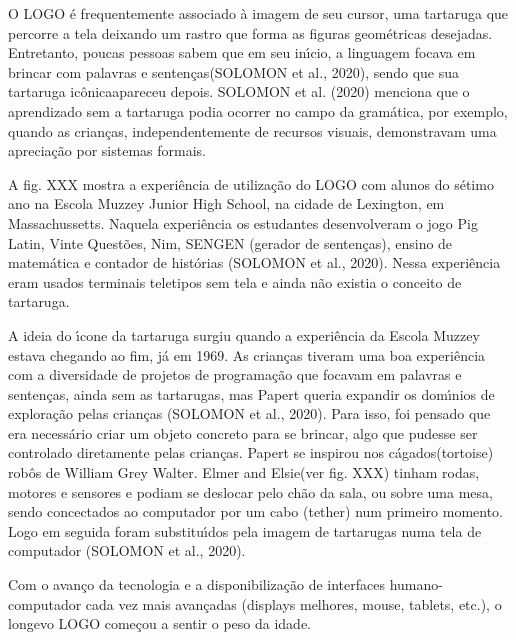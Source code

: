 \documentclass[
12pt,		%
openright,	%
twoside,  %
a4paper,			%
chapter=TITLE,		%
english,			%
french,				%
spanish,			%
brazil				%
]{USPSC-classe/USPSC}
\begin{document}
O LOGO \'e frequentemente associado \`a imagem de seu cursor, uma tartaruga que percorre a tela deixando um rastro que forma as figuras geom\'etricas desejadas. Entretanto, poucas pessoas sabem que em seu in\'{\i}cio, a linguagem \textquotedbl focava em brincar com palavras e senten\c{c}as\textquotedbl  (SOLOMON et al., 2020), sendo que sua tartaruga \textquotedbl ic\^onica\textquotedbl  apareceu depois.  SOLOMON et al. (2020) menciona que o aprendizado sem a tartaruga podia ocorrer no campo da gram\'atica, por exemplo, quando as crian\c{c}as, independentemente de recursos visuais, demonstravam uma aprecia\c{c}\~ao por sistemas formais.




A fig. XXX mostra a experi\^encia de utiliza\c{c}\~ao do LOGO com alunos do s\'etimo ano na Escola Muzzey Junior High School, na cidade de Lexington, em Massachussetts. Naquela experi\^encia os estudantes desenvolveram o jogo Pig Latin, Vinte Quest\~oes, Nim, SENGEN (gerador de senten\c{c}as), ensino de matem\'atica e contador de hist\'orias  (SOLOMON et al., 2020). Nessa experi\^encia eram usados terminais teletipos sem tela e ainda n\~ao existia o conceito de tartaruga.




A ideia do \'{\i}cone da tartaruga surgiu quando a experi\^encia da Escola Muzzey estava chegando ao fim, j\'a em 1969. As crian\c{c}as tiveram uma boa experi\^encia com a diversidade de projetos de programa\c{c}\~ao que focavam em palavras e senten\c{c}as, ainda sem as tartarugas, mas Papert queria expandir os dom\'{\i}nios de explora\c{c}\~ao pelas crian\c{c}as  (SOLOMON et al., 2020). Para isso, foi pensado que era necess\'ario criar um objeto concreto para se brincar, algo que pudesse ser controlado diretamente pelas crian\c{c}as. Papert se inspirou nos \textquotedbl c\'agados\textquotedbl   (tortoise) rob\^os de William Grey Walter. \textquotedbl Elmer and Elsie\textquotedbl  (ver fig. XXX) tinham rodas, motores e sensores e podiam se deslocar pelo ch\~ao da sala, ou sobre uma mesa, sendo concectados ao computador por um cabo (tether) num primeiro momento. Logo em seguida foram substitu\'{\i}dos pela imagem de tartarugas numa tela de computador (SOLOMON et al., 2020).




Com o avan\c{c}o da tecnologia e a disponibiliza\c{c}\~ao de interfaces humano-computador cada vez mais avan\c{c}adas (displays melhores, mouse, tablets, etc.), o longevo LOGO come\c{c}ou a sentir o peso da idade.
\end{document}
